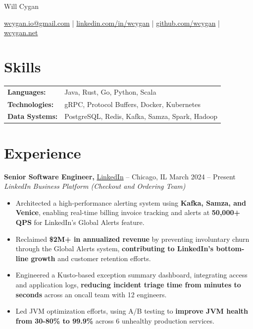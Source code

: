 \documentclass[10pt]{article}
\begin{document}
\centerline{\Huge Will Cygan}

\vspace{5pt}

\centerline{\href{mailto:wcygan.io@gmail.com}{wcygan.io@gmail.com} | \href{https://linkedin.com/in/wcygan}{linkedin.com/in/wcygan} | \href{https://github.com/wcygan}{github.com/wcygan} | \href{https://www.wcygan.net}{wcygan.net}}

\vspace{5pt}

\section*{Skills}
\vspace{4pt}
\begin{tabular}{@{}ll@{}}
\textbf{Languages:} & Java, Rust, Go, Python, Scala \\
\textbf{Technologies:} & gRPC, Protocol Buffers, Docker, Kubernetes \\
\textbf{Data Systems:} & PostgreSQL, Redis, Kafka, Samza, Spark, Hadoop
\end{tabular}

\vspace{5pt}

\section*{Experience}
\vspace{4pt}
\textbf{Senior Software Engineer,} \href{https://www.linkedin.com/}{LinkedIn} -- Chicago, IL \hfill March 2024 -- Present \\
{\small\textit{LinkedIn Business Platform (Checkout and Ordering Team)}}
\vspace{1pt}
\begin{itemize}
  \item Architected a high-performance alerting system using \textbf{Kafka, Samza, and Venice}, enabling real-time billing invoice tracking and alerts at \textbf{50,000+ QPS} for LinkedIn's Global Alerts feature.
  \item Reclaimed \textbf{\$2M+ in annualized revenue} by preventing involuntary churn through the Global Alerts system, \textbf{contributing to LinkedIn's bottom-line growth} and customer retention efforts.
  \item Engineered a Kusto-based exception summary dashboard, integrating access and application logs, \textbf{reducing incident triage time from minutes to seconds} across an oncall team with 12 engineers.
  \item Led JVM optimization efforts, using A/B testing to \textbf{improve JVM health from 30-80\% to 99.9\%} across 6 unhealthy production services.
\end{itemize}
\end{document}
